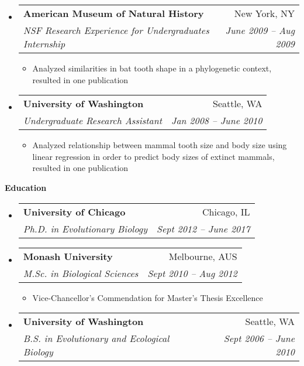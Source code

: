 \documentclass[letterpaper,11pt]{article}
\makeatletter
\newcommand{\resitem}[1]{\item #1 \vspace{-2pt}}
\newcommand{\resheading}[1]{{\large \colorbox{mygrey}{\begin{minipage}{\textwidth}{\textbf{#1 \vphantom{p\^{E}}}}\end{minipage}}}}
\newcommand{\ressubheading}[4]{
\begin{tabular*}{6.5in}{l@{\extracolsep{\fill}}r}
		\textbf{#1} & #2 \\
		\textit{#3} & \textit{#4} \\
\end{tabular*}\vspace{-6pt}}
\makeatother
\begin{document}
\begin{itemize}
    \item 
      \ressubheading{American Museum of Natural History}{New York, NY}{NSF Research Experience for Undergraduates Internship}{June 2009 -- Aug 2009}
        { \footnotesize
        \begin{itemize}
            \resitem{Analyzed similarities in bat tooth shape in a phylogenetic context, resulted in one publication }
        \end{itemize}
        }
    \item 
      \ressubheading{University of Washington}{Seattle, WA}{Undergraduate Research Assistant}{Jan 2008 -- June 2010}
        { \footnotesize
        \begin{itemize}
            \resitem{Analyzed relationship between mammal tooth size and body size using linear regression in order to predict body sizes of extinct mammals, resulted in one publication }
        \end{itemize}
        }
	\end{itemize}  %

\resheading{Education}
	\begin{itemize}
		\item
      \ressubheading{University of Chicago}{Chicago, IL}{Ph.D. in Evolutionary Biology}{Sept 2012 -- June 2017}
		\item
      \ressubheading{Monash University}{Melbourne, AUS}{M.Sc. in Biological Sciences}{Sept 2010 -- Aug 2012}
      \begin{itemize}
        \item Vice-Chancellor's Commendation for Master's Thesis Excellence
      \end{itemize}
		\item
      \ressubheading{University of Washington}{Seattle, WA}{B.S. in Evolutionary and Ecological Biology}{Sept 2006 -- June 2010}
	\end{itemize} %
\end{document}
